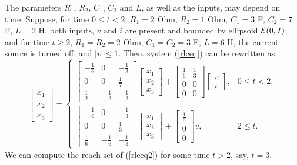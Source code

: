 The parameters $R_1$, $R_2$, $C_1$, $C_2$ and $L$, as well as the inputs,
may depend on time. Suppose, for time $0\leq t<2$, $R_1=2$ Ohm, $R_2=1$ Ohm,
$C_1=3$ F, $C_2=7$ F, $L=2$ H, both inputs, $v$ and $i$ are present and
bounded by ellipsoid $\EE(0,I)$; and for time $t\geq 2$,
$R_1=R_2=2$ Ohm, $C_1=C_2=3$ F, $L=6$ H, the current source is turned off,
and $|v|\leq 1$. Then, system (\ref{rlceq}) can be rewritten as
\begin{equation}
\left[\begin{array}{c}
\dot{x}_1\\
\dot{x}_2\\
\dot{x}_3\end{array}\right] = \left\{\begin{array}{ll}
\left[\begin{array}{ccc}
-\frac{1}{6} & 0 & -\frac{1}{3}\\
0 & 0 & \frac{1}{7}\\
\frac{1}{2} & -\frac{1}{2} & -\frac{1}{2}\end{array}\right]
\left[\begin{array}{c}
x_1\\
x_2\\
x_3\end{array}\right] + \left[\begin{array}{cc}
\frac{1}{6} & \frac{1}{3}\\
0 & 0\\
0 & 0\end{array}\right]\left[\begin{array}{c}
v\\
i\end{array}\right], & 0\leq t< 2, \\
\left[\begin{array}{ccc}
-\frac{1}{6} & 0 & -\frac{1}{3}\\
0 & 0 & \frac{1}{3}\\
\frac{1}{6} & -\frac{1}{6} & -\frac{1}{3}\end{array}\right]
\left[\begin{array}{c}
x_1\\
x_2\\
x_3\end{array}\right] + \left[\begin{array}{c}
\frac{1}{6} \\
0 \\
0 \end{array}\right]v, & 2\leq t. \end{array}\right.
\label{rlceq2}
\end{equation}
We can compute the reach set of (\ref{rlceq2}) for some time $t>2$, say, $t=3$.

